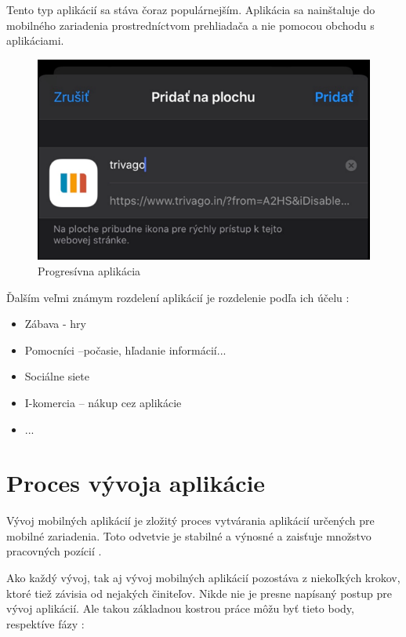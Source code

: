 \documentclass[10pt,twoside,slovak,a4paper]{article}
\begin{document}
\begin{itemize}
Tento typ aplikácií sa stáva čoraz populárnejším. Aplikácia sa nainštaluje do mobilného zariadenia prostredníctvom prehliadača a nie pomocou obchodu s aplikáciami.
\begin{figure}[h!]
\includegraphics[scale=0.75]{progresivna_aplikacia}
\centering
\caption{Progresívna aplikácia \cite{eliteml}}
\end{figure}

\end{itemize}

\newpage           %


Ďalším veľmi známym rozdelení aplikácií je rozdelenie podľa ich účelu \cite{winpc}:
\begin{itemize}
\item Zábava - hry
\item Pomocníci –počasie, hľadanie informácií...
\item Sociálne siete
\item I-komercia – nákup cez aplikácie
\item ...
\end{itemize}



\section{Proces vývoja aplikácie}
\quad Vývoj mobilných aplikácií je zložitý proces vytvárania aplikácií určených pre mobilné zariadenia. Toto odvetvie je stabilné a výnosné a zaisťuje množstvo pracovných pozícií \cite{eYewated2, wiki1}.

Ako každý vývoj, tak aj vývoj mobilných aplikácií pozostáva z niekoľkých krokov, ktoré tiež závisia od nejakých činiteľov. Nikde nie je presne napísaný postup pre vývoj aplikácií. Ale takou základnou kostrou práce môžu byť tieto body, respektíve fázy \cite{eYewated2, wiki1}:
\end{document}

